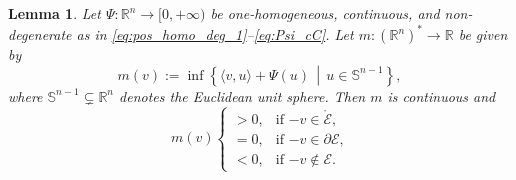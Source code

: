 \documentclass[reqno]{amsart}
\newtheorem{lemma}[theorem]{Lemma}
\theoremstyle{definition}
\begin{document}
\begin{lemma}
	\label{lem:InfLemma}
	Let $\Psi \colon {\mathbb{R}}^{n} \to [0, +\infty)$ be one-homogeneous, continuous, and non-degenerate as in \eqref{eq:pos_homo_deg_1}--\eqref{eq:Psi_cC}.  Let $m \colon ({\mathbb{R}}^{n})^{\ast} \to {\mathbb{R}}$ be given by
	\[
		m(v) := \inf \left\{ \langle v, u \rangle + \Psi(u) \,\middle|\, u \in \mathbb{S}^{n - 1} \right\},
	\]
	where $\mathbb{S}^{n - 1} \subsetneq {\mathbb{R}}^{n}$ denotes the Euclidean unit sphere.  Then $m$ is continuous and
	\[
		m(v)
		\begin{cases}
			> 0, & \text{if $- v \in \mathring{\mathcal{E}}$,} \\
			= 0, & \text{if $- v \in \partial {\mathcal{E}}$,} \\
			< 0, & \text{if $- v \not\in {\mathcal{E}}$.}
		\end{cases}
	\]
\end{lemma}
\end{document}
